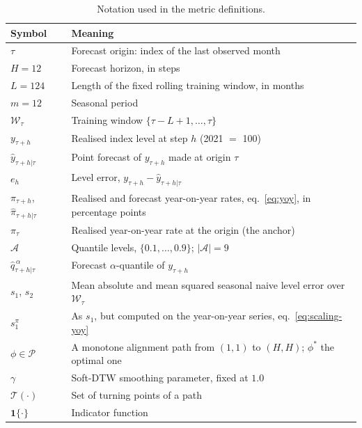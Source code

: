\documentclass[12pt]{article}
\begin{document}
\begin{table}[htbp]
\centering
\caption{Notation used in the metric definitions.}
\label{tab:notation}
\begin{tabular}{ll}
\toprule
Symbol & Meaning \\
\midrule
$\tau$ & Forecast origin: index of the last observed month \\
$H = 12$ & Forecast horizon, in steps \\
$L = 124$ & Length of the fixed rolling training window, in months \\
$m = 12$ & Seasonal period \\
$\mathcal{W}_\tau$ & Training window $\{\tau-L+1,\dots,\tau\}$ \\
$y_{\tau+h}$ & Realised index level at step $h$ (2021 $=$ 100) \\
$\hat{y}_{\tau+h|\tau}$ & Point forecast of $y_{\tau+h}$ made at origin $\tau$ \\
$e_h$ & Level error, $y_{\tau+h} - \hat{y}_{\tau+h|\tau}$ \\
$\pi_{\tau+h}$, $\hat{\pi}_{\tau+h|\tau}$ & Realised and forecast year-on-year rates, eq.~\eqref{eq:yoy}, in percentage points \\
$\pi_\tau$ & Realised year-on-year rate at the origin (the anchor) \\
$\mathcal{A}$ & Quantile levels, $\{0.1,\dots,0.9\}$; $|\mathcal{A}| = 9$ \\
$\hat{q}^{\,\alpha}_{\tau+h|\tau}$ & Forecast $\alpha$-quantile of $y_{\tau+h}$ \\
$s_1$, $s_2$ & Mean absolute and mean squared seasonal naive level error over $\mathcal{W}_\tau$ \\
$s_1^{\pi}$ & As $s_1$, but computed on the year-on-year series, eq.~\eqref{eq:scaling-yoy} \\
$\phi \in \mathcal{P}$ & A monotone alignment path from $(1,1)$ to $(H,H)$; $\phi^\ast$ the optimal one \\
$\gamma$ & Soft-DTW smoothing parameter, fixed at $1.0$ \\
$\mathcal{T}(\cdot)$ & Set of turning points of a path \\
$\mathbf{1}\{\cdot\}$ & Indicator function \\
\bottomrule
\end{tabular}
\end{table}
\end{document}
